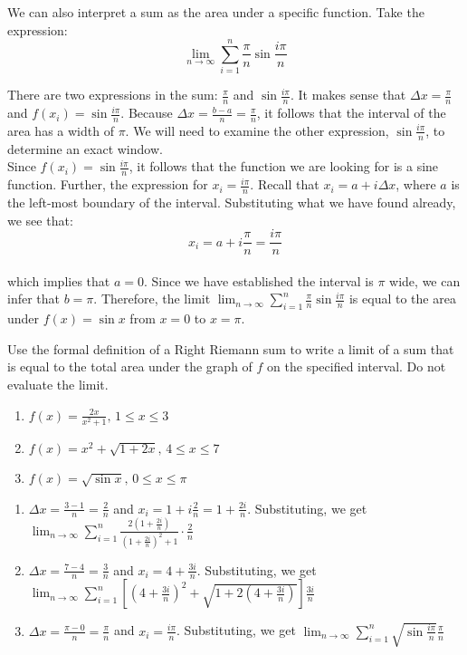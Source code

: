 We can also interpret a sum as the area under a specific function. Take the expression:\\
$$\lim_{n\to \infty} \sum_{i=1}^{n}\frac{\pi}{n}\sin{\frac{i\pi}{n}}$$

There are two expressions in the sum: $\frac{\pi}{n}$ and $\sin{\frac{i\pi}{n}}$. It makes sense that $\Delta x = \frac{\pi}{n}$ and $f(x_i)=\sin{\frac{i\pi}{n}}$. Because $\Delta x = \frac{b-a}{n}=\frac{\pi}{n}$, it follows that the interval of the area has a width of $\pi$. We will need to examine the other expression, $\sin{\frac{i\pi}{n}}$, to determine an exact window. \\

Since $f(x_i) = \sin{\frac{i\pi}{n}}$, it follows that the function we are looking for is a sine function. Further, the expression for $x_i = \frac{i\pi}{n}$. Recall that $x_i = a + i\Delta x$, where $a$ is the left-most boundary of the interval. Substituting what we have found already, we see that:\\
$$x_i=a+i\frac{\pi}{n} = \frac{i\pi}{n}$$\\
which implies that $a=0$. Since we have established the interval is $\pi$ wide, we can infer that $b=\pi$. Therefore, the limit $\lim_{n\to \infty}\sum_{i=1}^{n}\frac{\pi}{n}\sin{\frac{i\pi}{n}}$ is equal to the area under $f(x) = \sin{x}$ from $x=0$ to $x=\pi$. 

\begin{Exercise}[label=limsum1]
Use the formal definition of a Right Riemann sum to write a limit of a sum that is equal to the total area under the graph of $f$ on the specified interval. Do not evaluate the limit. 
\begin{enumerate}
\item $f(x) = \frac{2x}{x^2+1}\text{, } 1 \leq x \leq 3$
\item $f(x) = x^2+\sqrt{1+2x}\text{, } 4 \leq x \leq 7$
\item $f(x) = \sqrt{\sin{x}}\text{, } 0 \leq x \leq \pi$
\end{enumerate}
\end{Exercise}

\begin{Answer}[ref=limsum1]
\begin{enumerate}
\item $\Delta x = \frac{3-1}{n}=\frac{2}{n}$ and $x_i = 1+i\frac{2}{n}=1+\frac{2i}{n}$. Substituting, we get $\lim_{n\to\infty}\sum_{i=1}^{n}\frac{2(1+\frac{2i}{n})}{(1+\frac{2i}{n})^2+1} \cdot \frac{2}{n}$
\item $\Delta x = \frac{7-4}{n}=\frac{3}{n}$ and $x_i = 4+\frac{3i}{n}$. Substituting, we get $\lim_{n\to \infty}\sum_{i=1}^{n}[(4+\frac{3i}{n})^2+\sqrt{1+2(4+\frac{3i}{n})}]\frac{3i}{n}$
\item $\Delta x = \frac{\pi-0}{n}=\frac{\pi}{n}$ and $x_i = \frac{i\pi}{n}$. Substituting, we get $\lim_{n \to \infty}\sum_{i=1}^{n}\sqrt{\sin{\frac{i\pi}{n}}}\frac{\pi}{n}$
\end{enumerate}
\end{Answer}

